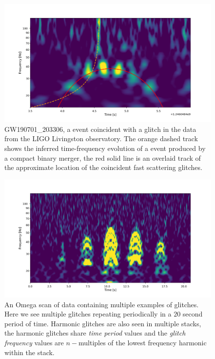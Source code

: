 \begin{figure}
  \includegraphics[width=\textwidth]{images/4_archenemy/Section1/GW190701_203306_overlay.pdf}
  \caption{GW190701\_203306, a \gw{} event coincident with a \scl{} glitch in the data from the LIGO Livingston observatory. The orange dashed track shows the inferred time-frequency evolution of a \gw{} event produced by a compact binary merger, the red solid line is an overlaid track of the approximate location of the coincident fast scattering glitches.}
  \label{4:fig:obscured_detection}
\end{figure}

\begin{figure}
  \includegraphics[width=\textwidth]{images/4_archenemy/Section1/multiple_harmonics.pdf}
  \caption{An Omega scan \cite{gwdetchar_tools:2021} of \gw{} data containing multiple examples of \scl{} glitches. Here we see multiple \scl{} glitches repeating periodically in a $20$ second period of time. Harmonic \scl{} glitches are also seen in multiple stacks, the harmonic glitches share \emph{time period} values and the \emph{glitch frequency} values are $n-$multiples of the lowest frequency harmonic within the stack.}
  \label{4:fig:consec_scattered_light}
\end{figure}


